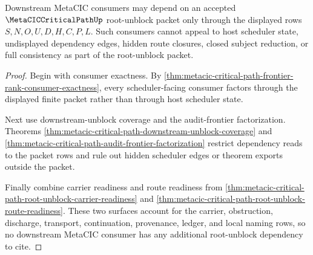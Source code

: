 \begin{theorem}
\label{thm:metacic-critical-path-root-unblock-consumer-readiness}
Downstream MetaCIC consumers may depend on an accepted $\MetaCICCriticalPathUp$ root-unblock packet only through the displayed rows $S,N,O,U,D,H,C,P,L$. Such consumers cannot appeal to host scheduler state, undisplayed dependency edges, hidden route closures, closed subject reduction, or full consistency as part of the root-unblock packet.
\end{theorem}
\begin{proof}
Begin with consumer exactness. By \autoref{thm:metacic-critical-path-frontier-rank-consumer-exactness}, every scheduler-facing consumer factors through the displayed finite packet rather than through host scheduler state.

Next use downstream-unblock coverage and the audit-frontier factorization. Theorems \autoref{thm:metacic-critical-path-downstream-unblock-coverage} and \autoref{thm:metacic-critical-path-audit-frontier-factorization} restrict dependency reads to the packet rows and rule out hidden scheduler edges or theorem exports outside the packet.

Finally combine carrier readiness and route readiness from \autoref{thm:metacic-critical-path-root-unblock-carrier-readiness} and \autoref{thm:metacic-critical-path-root-unblock-route-readiness}. These two surfaces account for the carrier, obstruction, discharge, transport, continuation, provenance, ledger, and local naming rows, so no downstream MetaCIC consumer has any additional root-unblock dependency to cite.
\end{proof}

